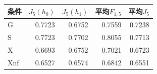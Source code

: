 \begin{tabular}{lrrrr}
\toprule
条件 & $J_5(h_0)$ & $J_5(h_1)$ & 平均$F_{1,5}$ & 平均$J_5$\\\midrule
G & 0.7723 & 0.6752 & 0.7559 & 0.7238 \\
S & 0.7723 & 0.7702 & 0.8055 & 0.7713 \\
X & 0.6693 & 0.6752 & 0.7021 & 0.6723 \\
Xnf & 0.6527 & 0.6574 & 0.6842 & 0.6551 \\
\bottomrule
\end{tabular}
